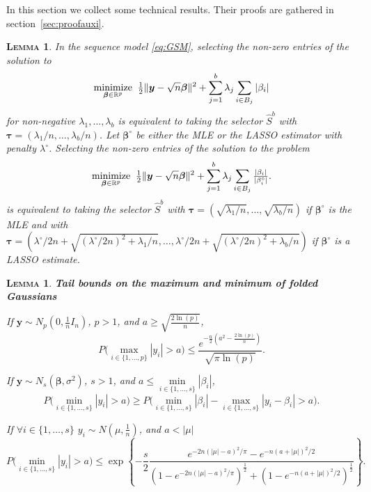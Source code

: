 \documentclass[aos]{imsart}
\theoremstyle{plain}
\newtheorem{lem}[thm]{\textsc{Lemma}}
\newcommand{\R}{\mathbb{R}}
\newcommand{\bs}{\boldsymbol}
\begin{document}
In this section we collect some technical results. Their proofs are gathered in section~\ref{sec:proofauxi}. 

\begin{lem}\label{lem:l1isthreshold}
	In the sequence model \eqref{eq:GSM}, selecting the non-zero entries  of the solution to 
\begin{equation}\label{eq:genl1}
	\underset{\bs \beta \in \R^p}{\rm minimize} \;\;\tfrac12\|\bs y-\sqrt{n}\bs\beta\|^2+\sum_{j=1}^b \lambda_j \sum_{i \in B_j}|\beta_{i}|
\end{equation}
for non-negative $\lambda_1,\ldots,\lambda_b$  is equivalent to taking the selector $\hat S^{b}$ with $\bs \tau=(\lambda_1/n,\ldots,\lambda_b/n)$. Let $\bs\beta^\circ$ be either the MLE or the LASSO estimator with penalty $\lambda^\circ$. Selecting the non-zero entries  of the solution to the problem
\begin{equation}\label{eq:genl1ada}
	\underset{\bs \beta \in \R^p}{\rm minimize} \;\;\tfrac12\|\bs y-\sqrt{n}\bs\beta\|^2+\sum_{j=1}^b \lambda_j \sum_{i \in B_j}\tfrac{|\beta_{i}|}{|\beta_i^\circ|}.
\end{equation}
is equivalent to taking the selector $\hat S^{b}$ with $\bs \tau=(\sqrt{\lambda_1/n},\ldots,\sqrt{\lambda_b/n})$ if $\bs\beta^\circ$ is the MLE and with $\bs \tau=(\lambda^\circ/2n+\sqrt{(\lambda^\circ/2n)^2+\lambda_1/n},\ldots,\lambda^\circ/2n+\sqrt{(\lambda^\circ/2n)^2+\lambda_b/n})$ if $\bs\beta^\circ$ is a LASSO estimate.
\end{lem}


\begin{lem}\label{lemma:3tailbounds}\textbf{Tail bounds on the maximum and minimum of folded Gaussians} 
\begin{longlist}
        \item If $\bs y\sim N_p\left(0,\frac{1}{n}I_n \right)$, $p>1$, and $a \geq \sqrt{\frac{2\ln(p)}{n}}$, $$P\Big(\underset{i\in\{1,\ldots,p\}}{\max}|y_i|> a \Big) \leq \frac{e^{-\frac{n}{2}\left(a^2-\frac{2\ln (p)}{n}\right)}}{\sqrt{\pi\ln (p)}}.$$
    \item If $\bs y\sim N_s\left(\bs\beta,\sigma^2\right)$, $s>1$, and $a \leq \underset{i\in\{1,\ldots,s\}}{\min}|\beta_i|$,
        $$P\Big(\underset{i\in\{1,\ldots,s\}}{\min}|y_i| > a\Big) \geq P\Big(\underset{i\in\{1,\ldots,s\}}{\min}|\beta_i|-\underset{i\in\{1,\ldots,s\}}{\max}|y_i-\beta_i| > a \Big).$$
    \item If  $\forall i\in\{1,\ldots,s\}$ $y_i\sim N\left(\mu,\frac{1}{n}\right)$, and $a<|\mu|$
        $$P\Big(\underset{i\in\{1,\ldots,s\}}{\min}|y_i| > a \Big) \leq \exp\left\{-\frac{s}{2}\frac{e^{-2n(|\mu|-a)^2/\pi}-e^{-n(a+|\mu|)^2/2}}{\left(1-e^{-2n(|\mu|-a)^2/\pi}\right)^{\frac{1}{2}}+\left(1-e^{-n(a+|\mu|)^2/2}\right)^{\frac{1}{2}}}\right\}.$$
\end{longlist}
\end{lem}
\end{document}
